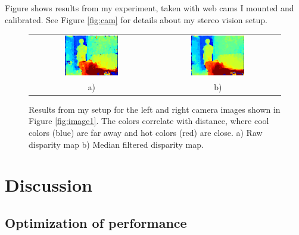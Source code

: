 \documentclass[11pt,fleqn]{article}
\begin{document}
\newpage
Figure \label{fig:image2} shows  results from my experiment, taken with web cams I mounted and calibrated. See Figure \ref{fig:cam} for details about my stereo vision setup.\\

\begin{figure}[!h]
\begin{mdframed}
\centering
\setlength{}
\begin{tabular}{cc}
\includegraphics[width=0.45\textwidth]{images/res.png} &
\includegraphics[width=0.45\textwidth]{images/nomedres.png} \\[2pt]
a) & b) \\
\end{tabular}
\caption[Results from my setup]{Results from my setup for the left and right camera images shown in Figure \ref{fig:image1}. The colors correlate with distance, where cool colors (blue) are far away and hot colors (red) are close. a) Raw disparity map b) Median filtered disparity map.}
\label{fig:image2}
\end{mdframed}
\end{figure}

\section{Discussion}

\subsection{Optimization of performance}
\end{document}
